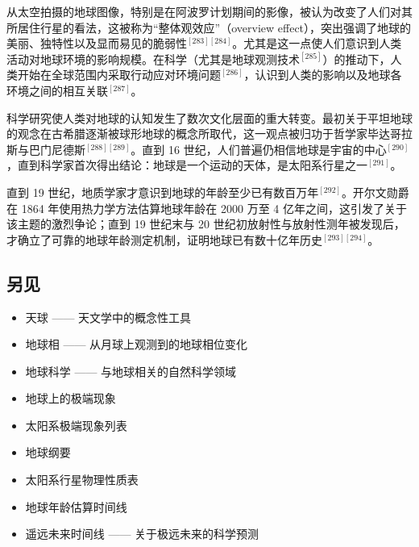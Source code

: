 从太空拍摄的地球图像，特别是在阿波罗计划期间的影像，被认为改变了人们对其所居住行星的看法，这被称为“整体观效应”（overview effect），突出强调了地球的美丽、独特性以及显而易见的脆弱性$^{[283][284]}$。尤其是这一点使人们意识到人类活动对地球环境的影响规模。在科学（尤其是地球观测技术$^{[285]}$）的推动下，人类开始在全球范围内采取行动应对环境问题$^{[286]}$，认识到人类的影响以及地球各环境之间的相互关联$^{[287]}$。

科学研究使人类对地球的认知发生了数次文化层面的重大转变。最初关于平坦地球的观念在古希腊逐渐被球形地球的概念所取代，这一观点被归功于哲学家毕达哥拉斯与巴门尼德斯$^{[288][289]}$。直到 16 世纪，人们普遍仍相信地球是宇宙的中心$^{[290]}$，直到科学家首次得出结论：地球是一个运动的天体，是太阳系行星之一$^{[291]}$。

直到 19 世纪，地质学家才意识到地球的年龄至少已有数百万年$^{[292]}$。开尔文勋爵在 1864 年使用热力学方法估算地球年龄在 2000 万至 4 亿年之间，这引发了关于该主题的激烈争论；直到 19 世纪末与 20 世纪初放射性与放射性测年被发现后，才确立了可靠的地球年龄测定机制，证明地球已有数十亿年历史$^{[293][294]}$。
\subsection{另见}
\begin{itemize}
\item 天球 —— 天文学中的概念性工具
\item 地球相 —— 从月球上观测到的地球相位变化
\item 地球科学 —— 与地球相关的自然科学领域
\item 地球上的极端现象
\item 太阳系极端现象列表
\item 地球纲要
\item 太阳系行星物理性质表
\item 地球年龄估算时间线
\item 遥远未来时间线 —— 关于极远未来的科学预测
\end{itemize}
